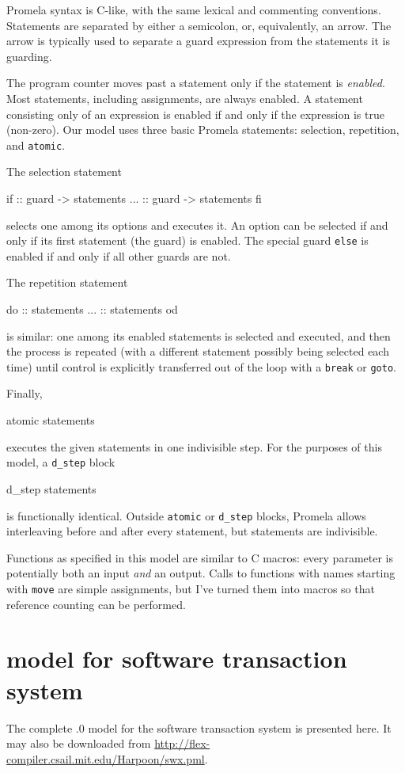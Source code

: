 Promela syntax is C-like, with the same lexical and commenting
conventions.  Statements are separated by either a semicolon, or,
equivalently, an arrow.  The arrow is typically used to separate a
guard expression from the statements it is guarding.

The program counter moves past a statement only if the statement is
{\it enabled}.  Most
statements, including assignments, are always enabled.
A statement consisting only of an expression is enabled if and only if the
expression is true (non-zero).
Our model uses three basic Promela statements: selection, repetition,
and {\tt atomic}.

The selection statement
\begin{inlinecode}
if
:: guard -> statements
...
:: guard -> statements
fi
\end{inlinecode}
selects one among its options and executes it.  An option can be
selected if and only if its first statement (the guard) is enabled.  The
special guard {\tt else} is enabled if and only if all other guards are not.

The repetition statement
\begin{inlinecode}
do
:: statements
...
:: statements
od
\end{inlinecode}
is similar: one among its enabled statements is selected and executed,
and then the process is repeated (with a different statement possibly
being selected each time) until control is explicitly transferred out
of the loop with a {\tt break} or {\tt goto}.

Finally,
\begin{inlinecode}
atomic { statements }
\end{inlinecode}
executes the given statements in one indivisible step.  For the
purposes of this model, a {\tt d\_step} block
\begin{inlinecode}
d_step { statements }
\end{inlinecode}
is functionally identical.
Outside {\tt atomic} or {\tt d\_step} blocks, Promela allows
interleaving before and after every statement, but statements are
indivisible.

Functions as specified in this model are similar to C macros: every
parameter is potentially both an input {\it and} an output.  Calls to
functions with names starting with {\tt move} are simple assignments,
but I've turned them into macros so that reference counting
can be performed.

\section{\Spin model for software transaction system}
The complete .0 model for the \flex software transaction system is
presented here.  It may also be downloaded from
\url{http://flex-compiler.csail.mit.edu/Harpoon/swx.pml}.

{\linespread{0.9}\footnotesize}

